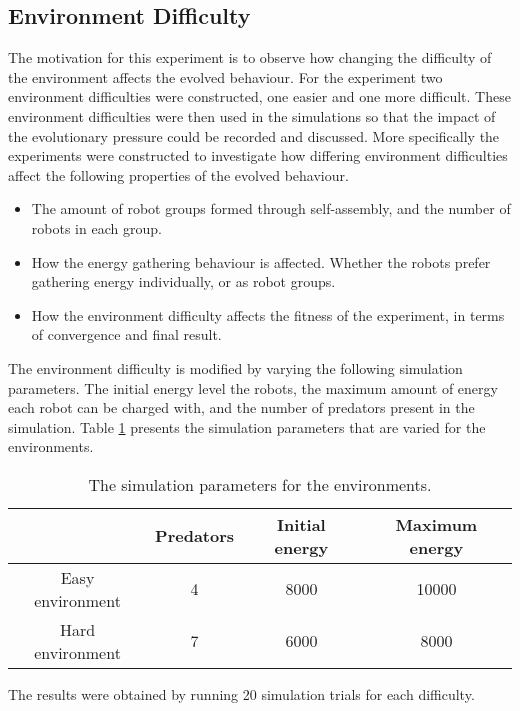 \newpage

\subsection{Environment Difficulty}
The motivation for this experiment is to observe how changing the difficulty of the environment affects the evolved behaviour.
For the experiment two environment difficulties were constructed, one easier and one more difficult.
These environment difficulties were then used in the simulations so that the impact of the evolutionary pressure could be recorded and discussed.
More specifically the experiments were constructed to investigate how differing environment difficulties affect the following properties of the evolved behaviour.

\begin{itemize}
	\item The amount of robot groups formed through self-assembly, and the number of robots in each group.
	\item How the energy gathering behaviour is affected. Whether the robots prefer gathering energy individually, or as robot groups. 
	\item How the environment difficulty affects the fitness of the experiment, in terms of convergence and final result.
\end{itemize}


The environment difficulty is modified by varying the following simulation parameters.
The initial energy level the robots, the maximum amount of energy each robot can be charged with, and the number of predators present in the simulation.
Table \ref{tab-environment} presents the simulation parameters that are varied for the environments.

\begin{table}[H]
	\centering
	\label{tab-environment}
	\begin{tabular}{|c|c|c|c|}
		\hline  & Predators & Initial energy & Maximum energy \\ 
		\hline Easy environment & 4 & 8000 & 10000 \\ 
		\hline Hard environment & 7 & 6000 & 8000 \\ 
		\hline 
		
	\end{tabular} 
	\caption{The simulation parameters for the environments.}
\end{table}

The results were obtained by running 20 simulation trials for each difficulty.
